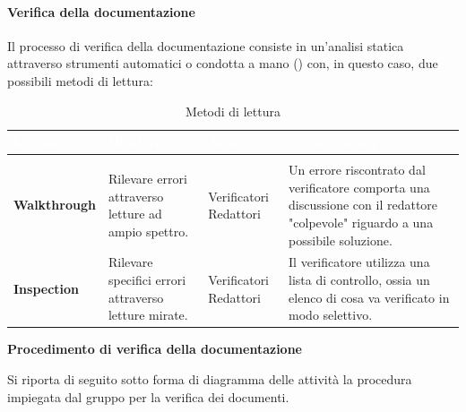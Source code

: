 \paragraph{Verifica della documentazione}
Il processo di verifica della documentazione consiste in un'analisi statica attraverso strumenti automatici o condotta a mano () con, in questo caso, due possibili metodi di lettura:   

\renewcommand{\arraystretch}{1.5}
\renewcommand\extrarowheight{1.5pt}
\begin{longtable}{C{3cm} | C{4cm} C{3cm} C{5cm}}
		\textcolor{white}{\textbf{Metodo}} & 
		\textcolor{white}{\textbf{Obiettivo}} & 
		\textcolor{white}{\textbf{Attori}} & 
		\textcolor{white}{\textbf{Caratteristica}} \\
		\endfirsthead
		\\
	    \endfoot
	    \caption{Metodi di lettura}
	    \endlastfoot
		\hline
		\textbf{Walkthrough} & 
		Rilevare errori attraverso letture ad ampio spettro. & 
		Verificatori \newline Redattori & 
		Un errore riscontrato dal verificatore comporta una discussione con il redattore "colpevole" riguardo a una possibile soluzione. \\
		\textbf{Inspection} & 
		Rilevare specifici errori attraverso letture mirate. & 
		Verificatori \newline Redattori & 
		Il verificatore utilizza una lista di controllo, ossia un elenco di cosa va verificato in modo selettivo. \\
\end{longtable}


\textbf{Procedimento di verifica della documentazione}

Si riporta di seguito sotto forma di diagramma delle attività la procedura impiegata dal gruppo \Gruppo{} per la verifica dei documenti.


